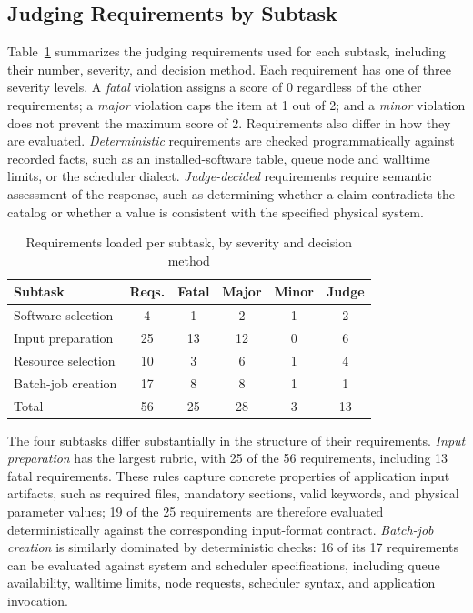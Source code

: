 \documentclass[conference]{IEEEtran}
\begin{document}
\subsection{Judging Requirements by Subtask}\label{sec:rubric-detail}
Table~\ref{tab:rubric} summarizes the judging requirements used for each subtask, including their number, severity, and decision method. Each requirement has one of three severity levels. A \emph{fatal} violation assigns a score of 0 regardless of the other requirements; a \emph{major} violation caps the item at 1 out of 2; and a \emph{minor} violation does not prevent the maximum score of 2. Requirements also differ in how they are evaluated. \emph{Deterministic} requirements are checked programmatically against recorded facts, such as an installed-software table, queue node and walltime limits, or the scheduler dialect. \emph{Judge-decided} requirements require semantic assessment of the response, such as determining whether a claim contradicts the catalog or whether a value is consistent with the specified physical system.
\begin{table}[t]
\centering
\caption{Requirements loaded per subtask, by severity and decision method}
\label{tab:rubric}
\begin{tabular}{lccccc}
\toprule
Subtask & Reqs. & Fatal & Major & Minor & Judge \\
\midrule
Software selection & 4 & 1 & 2 & 1 & 2 \\
Input preparation & 25 & 13 & 12 & 0 & 6 \\
Resource selection & 10 & 3 & 6 & 1 & 4 \\
Batch-job creation & 17 & 8 & 8 & 1 & 1 \\
\midrule
Total & 56 & 25 & 28 & 3 & 13 \\
\bottomrule
\end{tabular}
\end{table}
The four subtasks differ substantially in the structure of their requirements. \emph{Input preparation} has the largest rubric, with 25 of the 56 requirements, including 13 fatal requirements. These rules capture concrete properties of application input artifacts, such as required files, mandatory sections, valid keywords, and physical parameter values; 19 of the 25 requirements are therefore evaluated deterministically against the corresponding input-format contract. \emph{Batch-job creation} is similarly dominated by deterministic checks: 16 of its 17 requirements can be evaluated against system and scheduler specifications, including queue availability, walltime limits, node requests, scheduler syntax, and application invocation.
\end{document}
